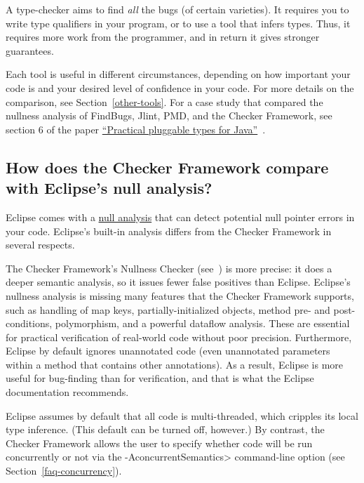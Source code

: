 A type-checker aims to find \emph{all} the bugs (of certain varieties).
It requires you to write type qualifiers in your program, or to use a tool
that infers types.  Thus, it requires more work from the programmer, and in
return it gives stronger guarantees.

Each tool is useful in different circumstances, depending on how important
your code is and your desired level of confidence in your code.  For more
details on the comparison, see Section~\ref{other-tools}.  For a case study
that compared the nullness analysis of FindBugs, Jlint, PMD, and the
Checker Framework, see section 6 of the paper
\href{http://homes.cs.washington.edu/~mernst/pubs/pluggable-checkers-issta2008.pdf}{``Practical pluggable types for Java''}~\cite{PapiACPE2008}.


\subsection{How does the Checker Framework compare with Eclipse's null analysis?\label{faq-eclipse}}

Eclipse comes with a
\href{http://help.eclipse.org/luna/index.jsp?topic=\%2Forg.eclipse.jdt.doc.user\%2Ftasks\%2Ftask-using_null_annotations.htm}{null analysis} that
can detect potential null pointer errors in your code.  Eclipse's built-in
analysis differs from the Checker Framework in several respects.

The Checker Framework's Nullness Checker
(see~) is more precise:  it does a deeper
semantic analysis, so it issues fewer false positives than Eclipse.
Eclipse's nullness analysis is missing many features that the Checker
Framework supports, such as handling of map keys, partially-initialized
objects, method pre- and post-conditions, polymorphism, and a powerful
dataflow analysis.  These are essential for practical verification of
real-world code without poor precision.
Furthermore, Eclipse by default ignores unannotated code (even unannotated
parameters within a method that contains other annotations).
As a result, Eclipse is more useful for bug-finding than for verification,
and that is what the Eclipse documentation recommends.

Eclipse assumes by default that all code is multi-threaded, which cripples its local
type inference.  (This default can be turned off, however.)
By contrast, the Checker Framework allows the user to
specify whether code will be run concurrently or not via the
\<-AconcurrentSemantics> command-line option (see
Section~\ref{faq-concurrency}).


